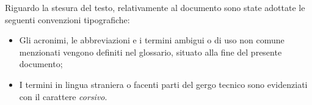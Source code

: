 \noindent Riguardo la stesura del testo, relativamente al documento sono state adottate le seguenti convenzioni tipografiche:
\begin{itemize}
	\item Gli acronimi, le abbreviazioni e i termini ambigui o di uso non comune menzionati vengono definiti nel glossario, situato alla fine del presente documento;
	\item I termini in lingua straniera o facenti parti del gergo tecnico sono evidenziati con il carattere \textit{corsivo}.
\end{itemize}

\newpage